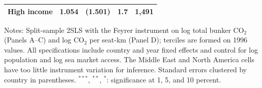 \documentclass[12pt]{article}
\begin{document}
\begin{table}[H]
{\begin{threeparttable}
\begin{tabular}{lcccc}
  High income & 1.054 & (1.501) & 1.7 & 1,491 \\
\bottomrule
\end{tabular}
\begin{tablenotes}[flushleft]
\footnotesize
\item Notes: Split-sample 2SLS with the Feyrer instrument on log total bunker CO$_2$ (Panels A--C) and log CO$_2$ per seat-km (Panel D); terciles are formed on 1996 values. All specifications include country and year fixed effects and control for log population and log sea market access. The Middle East and North America cells have too little instrument variation for inference. Standard errors clustered by country in parentheses. $^{***}$, $^{**}$, $^{*}$: significance at 1, 5, and 10 percent.
\end{tablenotes}
\end{threeparttable}}
\end{table}
\end{document}
